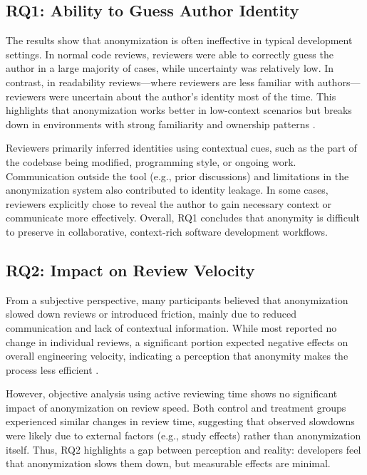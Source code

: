 \subsection{RQ1: Ability to Guess Author Identity}

The results show that anonymization is often ineffective in typical development settings. In normal code reviews, reviewers were able to correctly guess the author in a large majority of cases, while uncertainty was relatively low. In contrast, in readability reviews—where reviewers are less familiar with authors—reviewers were uncertain about the author’s identity most of the time. This highlights that anonymization works better in low-context scenarios but breaks down in environments with strong familiarity and ownership patterns .

Reviewers primarily inferred identities using contextual cues, such as the part of the codebase being modified, programming style, or ongoing work. Communication outside the tool (e.g., prior discussions) and limitations in the anonymization system also contributed to identity leakage. In some cases, reviewers explicitly chose to reveal the author to gain necessary context or communicate more effectively. Overall, RQ1 concludes that anonymity is difficult to preserve in collaborative, context-rich software development workflows.

\subsection{RQ2: Impact on Review Velocity}

From a subjective perspective, many participants believed that anonymization slowed down reviews or introduced friction, mainly due to reduced communication and lack of contextual information. While most reported no change in individual reviews, a significant portion expected negative effects on overall engineering velocity, indicating a perception that anonymity makes the process less efficient .

However, objective analysis using active reviewing time shows no significant impact of anonymization on review speed. Both control and treatment groups experienced similar changes in review time, suggesting that observed slowdowns were likely due to external factors (e.g., study effects) rather than anonymization itself. Thus, RQ2 highlights a gap between perception and reality: developers feel that anonymization slows them down, but measurable effects are minimal.

